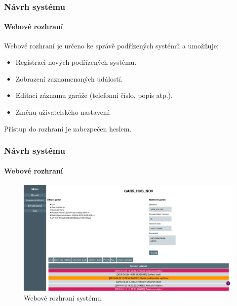 \documentclass{beamer}
\begin{document}
  \begin{frame}
    \frametitle{Návrh systému}
    \framesubtitle{Webové rozhraní}

    Webové rozhraní je určeno ke správě podřízených systémů a umožňuje:

    \begin{itemize}
      \item Registraci nových podřízených systému.
      \item Zobrazení zaznamenaných událostí.
      \item Editaci záznamu garáže (telefonní číslo, popis atp.).
      \item Změnu uživatelského nastavení.
    \end{itemize}

    Přístup do rozhraní je zabezpečen heslem.
    
  \end{frame}

  \begin{frame}
    \frametitle{Návrh systému}
    \framesubtitle{Webové rozhraní}


    \begin{figure}
        \includegraphics[scale=0.161]{../images/webp.png}
        \caption{Webové rozhraní systému.}
      \end{figure}
    
  \end{frame}
\end{document}
